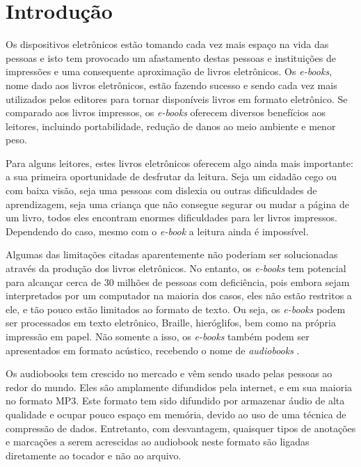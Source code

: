 \chapter[Introdução]{Introdução}\label{cap1}

Os dispositivos eletrônicos estão tomando cada vez mais espaço na vida das pessoas e isto tem provocado um afastamento destas pessoas e instituições de impressões e uma consequente aproximação de livros eletrônicos. Os \textit{e-books}, nome dado aos livros eletrônicos, estão fazendo sucesso e sendo cada vez mais utilizados pelos editores para tornar disponíveis livros em formato eletrônico. Se comparado aos livros impressos, os \textit{e-books} oferecem diversos benefícios aos leitores, incluindo portabilidade, redução de danos ao meio ambiente e menor peso.

Para alguns leitores, estes livros eletrônicos oferecem algo ainda mais importante: a sua primeira oportunidade de desfrutar da leitura. Seja um cidadão cego ou com baixa visão,  seja  uma pessoas com dislexia ou outras dificuldades de aprendizagem, seja uma criança que não consegue segurar ou mudar a página de um livro, todos eles encontram enormes dificuldades para ler livros impressos. Dependendo do caso, mesmo com o \textit{e-book} a leitura ainda é impossível.

Algumas das limitações citadas aparentemente não poderiam ser solucionadas através da produção dos livros eletrônicos. No entanto, os \textit{e-books} tem potencial para alcançar cerca de 30 milhões de pessoas com deficiência, pois embora sejam interpretados por um computador na maioria dos casos, eles não estão restritos a ele, e tão pouco estão limitados ao formato de texto. Ou seja, os \textit{e-books} podem ser processados em texto eletrônico, Braille, hieróglifos, bem como na própria impressão em papel. Não somente a isso, os \textit{e-books} também podem ser apresentados em formato acústico, recebendo o nome de \textit{audiobooks} \cite{herbert}.

Os audiobooks tem crescido no mercado e vêm sendo usado pelas pessoas ao redor do mundo. Eles são amplamente difundidos pela internet, e em sua maioria no formato MP3. Este formato tem sido difundido por armazenar áudio de alta qualidade e ocupar pouco espaço em memória, devido ao uso de uma técnica de compressão de dados. Entretanto, com desvantagem, quaisquer tipos de anotações e marcações a serem acrescidas ao audiobook neste formato são ligadas diretamente ao tocador e não ao arquivo. 

